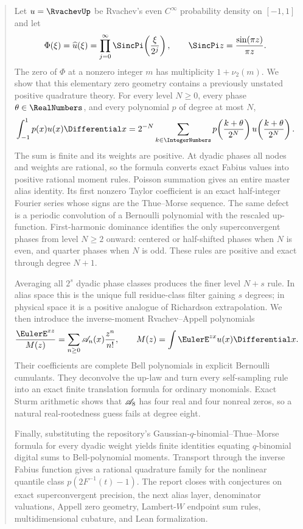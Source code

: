 \documentclass[11pt,oneside]{article}
\numberwithin{equation}{section}
\theoremstyle{definition}
\theoremstyle{remark}
\begin{document}
\hypersetup{pageanchor=false}



\clearpage
\hypersetup{pageanchor=true}

\begin{abstract}
Let $u=\RvachevUp$ be Rvachev's even $C^\infty$ probability density on $[-1,1]$ and let
\[
 \Phi(\xi)=\widehat u(\xi)
 =\prod_{j=0}^{\infty}\SincPi\!\left(\frac{\xi}{2^j}\right),
 \qquad \SincPi z=\frac{\sin(\pi z)}{\pi z}.
\]
The zero of $\Phi$ at a nonzero integer $m$ has multiplicity $1+\nu_2(m)$.  We show that this elementary zero geometry contains a previously unstated positive quadrature theory.  For every level $N\ge0$, every phase $\theta\in\RealNumbers$, and every polynomial $p$ of degree at most $N$,
\[
 \int_{-1}^{1}p(x)u(x)\Differential x
 =2^{-N}\sum_{k\in\IntegerNumbers}
 p\!\left(\frac{k+\theta}{2^N}\right)
 u\!\left(\frac{k+\theta}{2^N}\right).
\]
The sum is finite and its weights are positive.  At dyadic phases all nodes and weights are rational, so the formula converts exact Fabius values into positive rational moment rules.  Poisson summation gives an entire master alias identity.  Its first nonzero Taylor coefficient is an exact half-integer Fourier series whose signs are the Thue--Morse sequence.  The same defect is a periodic convolution of a Bernoulli polynomial with the rescaled up-function.  First-harmonic dominance identifies the only superconvergent phases from level $N\ge2$ onward: centered or half-shifted phases when $N$ is even, and quarter phases when $N$ is odd.  These rules are positive and exact through degree $N+1$.

Averaging all $2^s$ dyadic phase classes produces the finer level $N+s$ rule.  In alias space this is the unique full residue-class filter gaining $s$ degrees; in physical space it is a positive analogue of Richardson extrapolation.  We then introduce the inverse-moment Rvachev--Appell polynomials
\[
 \frac{\EulerE^{xz}}{M(z)}=\sum_{n\ge0}\Acal_n(x)\frac{z^n}{n!},
 \qquad
 M(z)=\int\EulerE^{zx}u(x)\Differential x.
\]
Their coefficients are complete Bell polynomials in explicit Bernoulli cumulants.  They deconvolve the up-law and turn every self-sampling rule into an exact finite translation formula for ordinary monomials.  Exact Sturm arithmetic shows that $\Acal_8$ has four real and four nonreal zeros, so a natural real-rootedness guess fails at degree eight.

Finally, substituting the repository's Gaussian-$q$-binomial--Thue--Morse formula for every dyadic weight yields finite identities equating $q$-binomial digital sums to Bell-polynomial moments.  Transport through the inverse Fabius function gives a rational quadrature family for the nonlinear quantile class $p(2F^{-1}(t)-1)$.  The report closes with conjectures on exact superconvergent precision, the next alias layer, denominator valuations, Appell zero geometry, Lambert-$W$ endpoint sum rules, multidimensional cubature, and Lean formalization.
\end{abstract}
\end{document}
